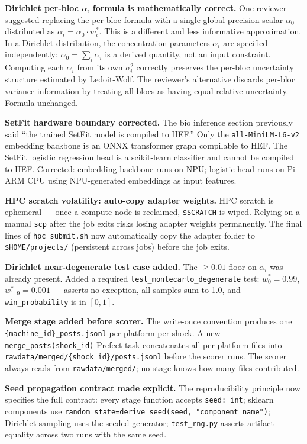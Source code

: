 \documentclass[11pt]{article}
\begin{document}
\textbf{Dirichlet per-bloc $\alpha_i$ formula is mathematically correct.}
One reviewer suggested replacing the per-bloc formula with a single global
precision scalar $\alpha_0$ distributed as $\alpha_i = \alpha_0 \cdot w^*_i$.
This is a different and less informative approximation. In a Dirichlet distribution,
the concentration parameters $\alpha_i$ are specified independently;
$\alpha_0 = \sum_i \alpha_i$ is a derived quantity, not an input constraint.
Computing each $\alpha_i$ from its own $\sigma^2_i$ correctly preserves the
per-bloc uncertainty structure estimated by Ledoit-Wolf. The reviewer's alternative
discards per-bloc variance information by treating all blocs as having equal relative
uncertainty. Formula unchanged.

\textbf{SetFit hardware boundary corrected.} The bio inference section previously
said ``the trained SetFit model is compiled to HEF.'' Only the \texttt{all-MiniLM-L6-v2}
embedding backbone is an ONNX transformer graph compilable to HEF. The SetFit
logistic regression head is a scikit-learn classifier and cannot be compiled to HEF.
Corrected: embedding backbone runs on NPU; logistic head runs on Pi ARM CPU using
NPU-generated embeddings as input features.

\textbf{HPC scratch volatility: auto-copy adapter weights.} HPC scratch is ephemeral
--- once a compute node is reclaimed, \texttt{\$SCRATCH} is wiped. Relying on a
manual \texttt{scp} after the job exits risks losing adapter weights permanently.
The final lines of \texttt{hpc\_submit.sh} now automatically copy the adapter
folder to \texttt{\$HOME/projects/} (persistent across jobs) before the job exits.

\textbf{Dirichlet near-degenerate test case added.} The $\geq 0.01$ floor on $\alpha_i$
was already present. Added a required \texttt{test\_montecarlo\_degenerate} test:
$w^*_0 = 0.99$, $w^*_{1..9} = 0.001$ --- asserts no exception, all samples sum to
1.0, and \texttt{win\_probability} is in $[0,1]$.

\textbf{Merge stage added before scorer.} The write-once convention produces one
\texttt{\{machine\_id\}\_posts.jsonl} per platform per shock. A new
\texttt{merge\_posts(shock\_id)} Prefect task concatenates all per-platform files
into \texttt{rawdata/merged/\{shock\_id\}/posts.jsonl} before the scorer runs.
The scorer always reads from \texttt{rawdata/merged/}; no stage knows how many
files contributed.

\textbf{Seed propagation contract made explicit.} The reproducibility principle now
specifies the full contract: every stage function accepts \texttt{seed: int};
sklearn components use \texttt{random\_state=derive\_seed(seed, "component\_name")};
Dirichlet sampling uses the seeded generator; \texttt{test\_rng.py} asserts
artifact equality across two runs with the same seed.
\end{document}
